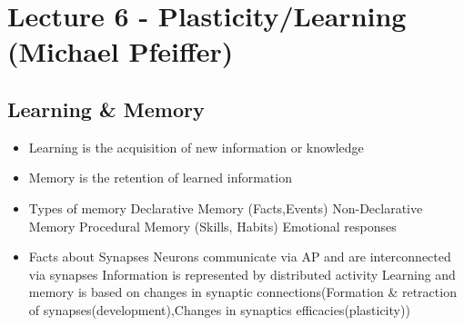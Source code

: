 \documentclass[english,11pt]{article}
\begin{document}
\section{Lecture 6 - Plasticity/Learning (Michael Pfeiffer)}

\subsection{Learning \& Memory}
\begin{itemize}
\item Learning is the acquisition of new information or knowledge
\item Memory is the retention of learned information
\item Types of memory
\subitem Declarative Memory (Facts,Events)
\subitem Non-Declarative Memory
\subitem Procedural Memory (Skills, Habits)
\subitem Emotional responses
\item Facts about Synapses
\subitem Neurons communicate via AP and are interconnected via synapses
\subitem Information is represented by distributed activity
\subitem Learning and memory is based on changes in synaptic connections(Formation \& retraction of synapses(development),Changes in synaptics efficacies(plasticity))
\end{itemize}
\end{document}
